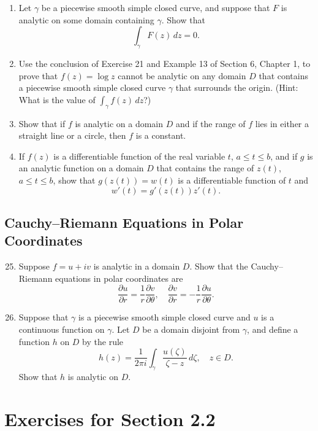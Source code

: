 \documentclass[12pt]{article}
\theoremstyle{definition} %
\theoremstyle{plain} %
\begin{document}
\begin{enumerate}
    \item Let $\gamma$ be a piecewise smooth simple closed curve, and suppose that $F$ is analytic on some domain containing $\gamma$. Show that
    \[
    \int_\gamma F(z) \, dz = 0.
    \]
    
    \item Use the conclusion of Exercise 21 and Example 13 of Section 6, Chapter 1, to prove that $f(z) = \log z$ cannot be analytic on any domain $D$ that contains a piecewise smooth simple closed curve $\gamma$ that surrounds the origin. (Hint: What is the value of $\int_\gamma f(z) \, dz$?)
    
    \item Show that if $f$ is analytic on a domain $D$ and if the range of $f$ lies in either a straight line or a circle, then $f$ is a constant.
    
    \item If $f(z)$ is a differentiable function of the real variable $t$, $a \le t \le b$, and if $g$ is an analytic function on a domain $D$ that contains the range of $z(t)$, $a \le t \le b$, show that $g(z(t)) = w(t)$ is a differentiable function of $t$ and
    \[
    w'(t) = g'(z(t)) z'(t).
    \]
\end{enumerate}

\subsection*{Cauchy–Riemann Equations in Polar Coordinates}
\begin{enumerate}
    \setcounter{enumi}{24}
    \item Suppose $f = u + iv$ is analytic in a domain $D$. Show that the Cauchy–Riemann equations in polar coordinates are
    \[
    \frac{\partial u}{\partial r} = \frac{1}{r} \frac{\partial v}{\partial \theta}, \quad 
    \frac{\partial v}{\partial r} = -\frac{1}{r} \frac{\partial u}{\partial \theta}.
    \]

    \item Suppose that $\gamma$ is a piecewise smooth simple closed curve and $u$ is a continuous function on $\gamma$. Let $D$ be a domain disjoint from $\gamma$, and define a function $h$ on $D$ by the rule
    \[
    h(z) = \frac{1}{2\pi i} \int_\gamma \frac{u(\zeta)}{\zeta - z} \, d\zeta, \quad z \in D.
    \]
    Show that $h$ is analytic on $D$.
\end{enumerate}

\section*{Exercises for Section 2.2}
\end{document}
